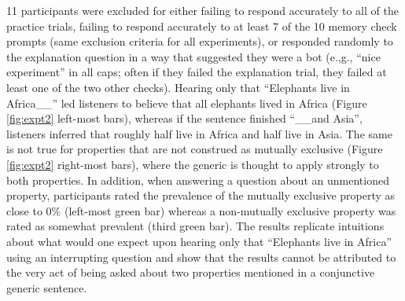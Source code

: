 \documentclass[10pt,letterpaper]{article}
\begin{document}
11 participants were excluded for either failing to respond accurately to all of the practice trials, failing to respond accurately to at least 7 of the 10 memory check prompts (same exclusion criteria for all experiments), or responded randomly to the explanation question in a way that suggested they were a bot (e.,g., ``nice experiment'' in all caps; often if they failed the explanation trial, they failed at least one of the two other checks). 
Hearing only that ``Elephants live in Africa\_\_'' led listeners to believe that all elephants lived in Africa (Figure \ref{fig:expt2} left-most bars), whereas if the sentence finished ``\_\_and Asia'', listeners inferred that roughly half live in Africa and half live in Asia. 
The same is not true for properties that are not construed as mutually exclusive (Figure \ref{fig:expt2} right-most bars), where the generic is thought to apply strongly to both properties. 
In addition, when answering a question about an unmentioned property, participants rated the prevalence of the mutually exclusive property as close to 0\% (left-most green bar) whereas a non-mutually exclusive property was rated as somewhat prevalent (third green bar).
The results replicate intuitions about what would one expect upon hearing only that ``Elephants live in Africa'' using an interrupting question and show that the results cannot be attributed to the very act of being asked about two properties mentioned in a conjunctive generic sentence.


\end{document}
